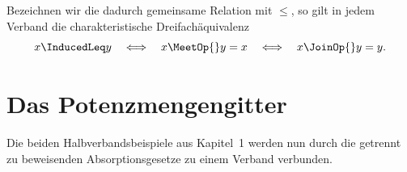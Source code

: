 \documentclass[main.tex]{subfiles}
\begin{document}
Bezeichnen wir die dadurch gemeinsame Relation mit \(\leq\), so gilt in
jedem Verband die charakteristische Dreifachäquivalenz
\[
  x\InducedLeq y
  \quad\Longleftrightarrow\quad
  x\MeetOp{}y=x
  \quad\Longleftrightarrow\quad
  x\JoinOp{}y=y.
\]

\section{Das Potenzmengengitter}

Die beiden Halbverbandsbeispiele aus Kapitel~1 werden nun durch die getrennt
zu beweisenden Absorptionsgesetze zu einem Verband verbunden.

\begin{tabproof}
\end{tabproof}

\begin{tabproof}
\end{tabproof}
\end{document}
